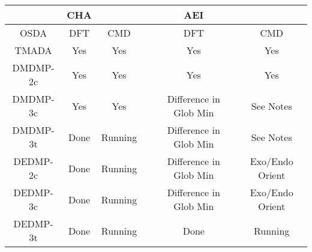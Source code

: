 \documentclass[journal=accacs,manuscript=article, email=true, layout=traditional]{achemso}
\begin{document}
\begin{center}
\begin{tabular}{c c c| c c c  }
 \hline
          & CHA &  & & AEI &\\ 
 \hline
 OSDA     & DFT & CMD &  & DFT & CMD \\
 \hline
 TMADA    & Yes & Yes &  & Yes & Yes \\ 
 DMDMP-2c & Yes & Yes &  & Yes & Yes \\  
 DMDMP-3c & Yes & Yes &  & Difference in Glob Min & See Notes\\
 DMDMP-3t & Done & Running &  & Difference in Glob Min & See Notes \\
 DEDMP-2c & Done & Running &  & Difference in Glob Min & Exo/Endo Orient \\
 DEDMP-3c & Done & Running &  & Difference in Glob Min & Exo/Endo Orient \\
 DEDMP-3t & Done & Running &  & Done & Running \\ 
 \hline
\end{tabular}
\end{center}
\end{document}
